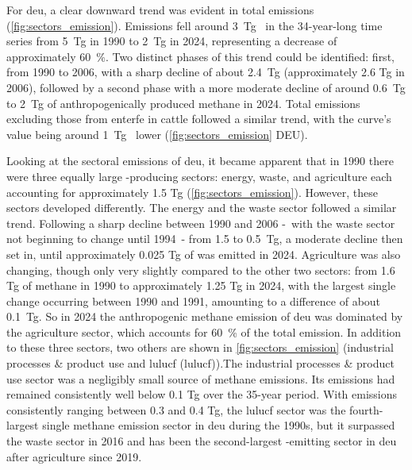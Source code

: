 For \acrshort{deu}, a clear downward trend was evident in total  emissions (\cref{fig:sectors_emission}). Emissions fell around 3~Tg~ in the 34-year-long time series from 5~Tg in 1990 to 2~Tg in 2024, representing a decrease of approximately 60~\%. Two distinct phases of this trend could be identified: first, from 1990 to 2006, with a sharp decline of about 2.4~Tg  (approximately 2.6 Tg  in 2006), followed by a second phase with a more moderate decline of around 0.6~Tg to 2~Tg of anthropogenically produced methane in 2024.
Total emissions excluding those from \acrfull{enterfe} in cattle followed a similar trend, with the curve’s value being around 1~Tg~ lower (\cref{fig:sectors_emission} DEU).

Looking at the sectoral emissions of \acrshort{deu}, it became apparent that in 1990 there were three equally large -producing sectors: energy, waste, and agriculture each accounting for approximately 1.5 Tg  (\cref{fig:sectors_emission}). However, these sectors developed differently.
The energy and the waste sector followed a similar trend. Following a sharp decline between 1990 and 2006 -~with the waste sector not beginning to change until 1994~- from 1.5 to 0.5~Tg, a moderate decline then set in, until approximately 0.025 Tg of  was emitted in 2024.
Agriculture was also changing, though only very slightly compared to the other two sectors: from 1.6 Tg of methane in 1990 to approximately 1.25 Tg  in 2024, with the largest single change occurring between 1990 and 1991, amounting to a difference of about 0.1~Tg. So in 2024 the anthropogenic methane emission of \acrshort{deu} was dominated by the agriculture sector, which accounts for 60~\% of the total emission.
In addition to these three sectors, two others are shown in \cref{fig:sectors_emission} (industrial processes \& product use and \acrshort{lulucf} (\acrlong{lulucf})).The industrial processes \& product use sector was a negligibly small source of methane emissions. Its  emissions had remained consistently well below 0.1 Tg over the 35-year period. With  emissions consistently ranging between 0.3 and 0.4 Tg, the \acrshort{lulucf} sector was the fourth-largest single methane emission sector in \acrshort{deu} during the 1990s,
but it surpassed the waste sector in 2016 and has been the second-largest -emitting sector in \acrshort{deu} after agriculture since 2019.

